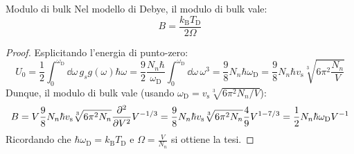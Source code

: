 \begin{proposition}{Modulo di bulk}{}
	Nel modello di Debye, il modulo di bulk vale:
	\begin{equation}
		B = \frac{k_\text{B} T_\text{D}}{2 \Omega}
	\end{equation}

	\tcblower

	\begin{proof}
		Esplicitando l'energia di punto-zero:
		\begin{equation*}
			U_0 = \frac{1}{2} \int_0^{\omega_\text{D}} \dd\omega\, g_s g(\omega) \hbar \omega = \frac{9}{2} \frac{N_n \hbar}{\omega_\text{D}} \int_0^{\omega_\text{D}} \dd\omega\, \omega^3 = \frac{9}{8} N_n \hbar \omega_\text{D} = \frac{9}{8} N_n \hbar v_\text{s} \sqrt[3]{6\pi^2 \frac{N_n}{V}}
		\end{equation*}
		Dunque, il modulo di bulk vale (usando $ \omega_\text{D} = v_\text{s} \sqrt[3]{6\pi^2 N_n / V} $):
		\begin{equation*}
			B = V \frac{9}{8} N_n \hbar v_\text{s} \sqrt[3]{6\pi^2 N_n} \frac{\partial^2}{\partial V^2} V^{-1/3} = \frac{9}{8} N_n \hbar v_\text{s} \sqrt[3]{6\pi^2 N_n} \frac{4}{9} V^{1-7/3} = \frac{1}{2} N_n \hbar \omega_\text{D} V^{-1}
		\end{equation*}
		Ricordando che $ \hbar \omega_\text{D} = k_\text{B} T_\text{D} $ e $ \Omega = \frac{V}{N_n} $ si ottiene la tesi.
	\end{proof}
\end{proposition}











